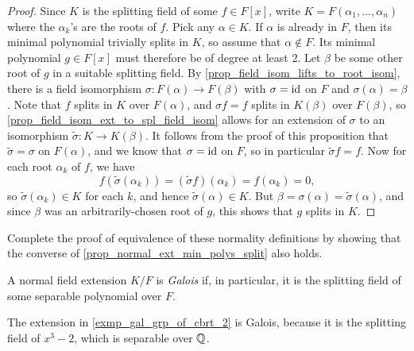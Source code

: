 \begin{proof}
    Since $K$ is the splitting field of some $f \in F[x]$, write $K = F(\alpha_1, \ldots, \alpha_n)$ where the $\alpha_k$'s are the roots of $f$. Pick any $\alpha \in K$. If $\alpha$ is already in $F$, then its minimal polynomial trivially splits in $K$, so assume that $\alpha \not\in F$. Its minimal polynomial $g \in F[x]$ must therefore be of degree at least 2. Let $\beta$ be some other root of $g$ in a suitable splitting field.
    By \cref{prop_field_isom_lifts_to_root_isom}, there is a field isomorphism $\sigma: F(\alpha) \to F(\beta)$ with $\sigma = \operatorname{id}$ on $F$ and $\sigma(\alpha) = \beta$. Note that $f$ splits in $K$ over $F(\alpha)$, and $\sigma f = f$ splits in $K(\beta)$ over $F(\beta)$, so \cref{prop_field_isom_ext_to_spl_field_isom} allows for an extension of $\sigma$ to an isomorphism $\widetilde{\sigma}: K \to K(\beta)$. It follows from the proof of this proposition that $\widetilde{\sigma} = \sigma$ on $F(\alpha)$, and we know that $\sigma = \operatorname{id}$ on $F$, so in particular $\widetilde{\sigma}f = f$. Now for each root $\alpha_k$ of $f$, we have
    \[
        f(\widetilde{\sigma}(\alpha_k)) = (\widetilde{\sigma} f)(\alpha_k) = f(\alpha_k) = 0,
    \]
    so $\widetilde{\sigma}(\alpha_k) \in K$ for each $k$, and hence $\widetilde{\sigma}(\alpha) \in K$. But $\beta = \sigma(\alpha) = \widetilde{\sigma}(\alpha)$, and since $\beta$ was an arbitrarily-chosen root of $g$, this shows that $g$ splits in $K$.
\end{proof}

\begin{exercise}
    Complete the proof of equivalence of these normality definitions by showing that the converse of \cref{prop_normal_ext_min_polys_split} also holds.
\end{exercise}

\begin{definition}
    A normal field extension $K/F$ is \emph{Galois} if, in particular, it is the splitting field of some separable polynomial over $F$.
\end{definition}

\begin{example}
\label{exmp_gal_ext}
    The extension in \cref{exmp_gal_grp_of_cbrt_2} is Galois, because it is the splitting field of $x^3 - 2$, which is separable over $\mathbb{{Q}}$.
\end{example}

